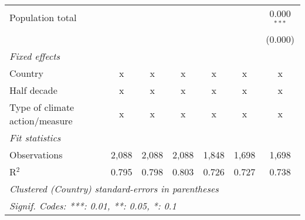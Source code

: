 \begin{tabular}{lcccccc}
   Population total                                             &         &               &                &                &               & 0.000$^{***}$\\   
                                                                &         &               &                &                &               & (0.000)\\   
   \emph{Fixed effects}\\
   Country                                                      & x       & x             & x              & x              & x             & x\\  
   Half decade                                                  & x       & x             & x              & x              & x             & x\\  
   Type of climate action/measure                               & x       & x             & x              & x              & x             & x\\  
   \midrule \emph{Fit statistics}\\
   Observations                                                 & 2,088   & 2,088         & 2,088          & 1,848          & 1,698         & 1,698\\  
   R$^2$                                                        & 0.795   & 0.798         & 0.803          & 0.726          & 0.727         & 0.738\\  
   \midrule
   \multicolumn{7}{l}{\emph{Clustered (Country) standard-errors in parentheses}}\\
   \multicolumn{7}{l}{\emph{Signif. Codes: ***: 0.01, **: 0.05, *: 0.1}}\\
\end{tabular}
\par\endgroup


